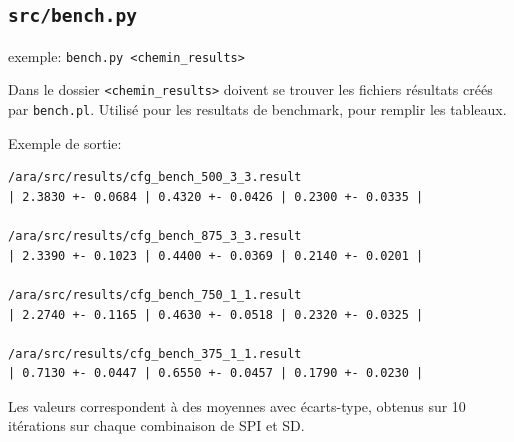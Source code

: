 \documentclass[a4paper]{article}
\begin{document}
\begin{appendix}
    \subsection{\texttt{src/bench.py}}
    exemple: \texttt{bench.py <chemin\_results>}

    Dans le dossier \texttt{<chemin\_results>} doivent se trouver les fichiers résultats créés par \texttt{bench.pl}. Utilisé pour les resultats de benchmark, pour remplir les tableaux.

Exemple de sortie:
\begin{verbatim}
/ara/src/results/cfg_bench_500_3_3.result
| 2.3830 +- 0.0684 | 0.4320 +- 0.0426 | 0.2300 +- 0.0335 |

/ara/src/results/cfg_bench_875_3_3.result
| 2.3390 +- 0.1023 | 0.4400 +- 0.0369 | 0.2140 +- 0.0201 |

/ara/src/results/cfg_bench_750_1_1.result
| 2.2740 +- 0.1165 | 0.4630 +- 0.0518 | 0.2320 +- 0.0325 |

/ara/src/results/cfg_bench_375_1_1.result
| 0.7130 +- 0.0447 | 0.6550 +- 0.0457 | 0.1790 +- 0.0230 |
\end{verbatim}
Les valeurs correspondent à des moyennes avec écarts-type, obtenus sur
10 itérations sur chaque combinaison de SPI et SD.

\end{appendix}
\end{document}
